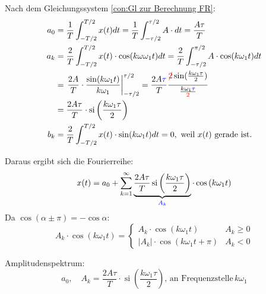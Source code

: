 Nach dem Gleichungssystem \ref{con:Gl zur Berechnung FR}:\\
\begin{equation}
\begin{aligned}
    a_{0} &=\frac{1}{T} \int_{-T / 2}^{T / 2} x(t) d t=\frac{1}{T} \int_{-\tau / 2}^{\tau / 2} A \cdot d t=\frac{A \tau}{T} \\
    a_{k} &=\frac{2}{T} \int_{-T / 2}^{T / 2} x(t) \cdot \cos (k \omega \omega_{1} t) d t=\frac{2}{T} \int_{-\tau / 2}^{\pi / 2} A \cdot \cos (k \omega_{1} t) d t \\
    &=\left.\frac{2 A}{T} \cdot \frac{\sin (k \omega_{1} t)}{k \omega_{1}}\right|_{-\tau / 2} ^{\tau / 2}=\frac{2 A \textcolor{blue}{\tau}}{T} \frac{{\textcolor {red}{\xout{2}}} \sin (\frac{k \omega_{1} \tau}{2})}{\frac{k \omega_{1} \textcolor{blue}{\tau}}{\textcolor{red}{2} }} \\
    &=\frac{2 A \tau}{T} \cdot \operatorname{si}\left(\frac{k \omega_{1} \tau}{2}\right) \\
    b_{k} &=\frac{2}{T} \int_{-T / 2}^{T / 2} x(t) \cdot \sin (k \omega_{1} t )d t=0, \text { weil } x(t) \text { gerade ist. }
    \end{aligned}
\end{equation}

Daraus ergibt sich die Fourierreihe:\\
\begin{equation}
    x(t)=a_{0}+\sum_{k=1}^{\infty} \underbrace{\frac{2 A \tau}{T} \operatorname{si}\left(\frac{k \omega_{1} \tau}{2}\right)}_{\textcolor{blue}{A_k}} \cdot \cos \left(k \omega_{1} t\right)
    \nonumber
\end{equation}
Da $\cos(\alpha \pm \pi)=-\cos \alpha$:\\
\begin{equation}
    A_{k} \cdot \cos \left(k \omega_{1} t\right)= \begin{cases}A_{k} \cdot \cos \left(k \omega_{1} t\right) & A_{k} \geqslant 0 \\ \left|A_{k}\right| \cdot \cos \left(k \omega_{1} t+\pi\right) & A_{k}<0\end{cases}
\end{equation}

Amplitudenspektrum:\\
\begin{equation}
    a_0, \quad A_{k}=\frac{2 A \tau}{T} \cdot \operatorname{si}\left(\frac{k \omega_{1} \tau}{2}\right) \text {, an Frequenzstelle}\, k \omega_{1}
    \nonumber
\end{equation}


